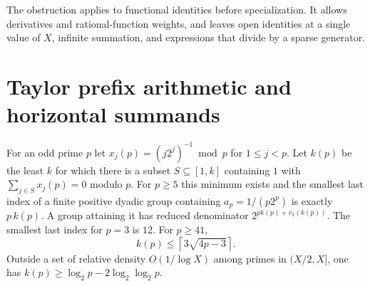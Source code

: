 \documentclass[11pt]{article}
\begin{document}
The obstruction applies to functional identities before specialization. It allows derivatives and rational-function weights, and leaves open identities at a single value of $X$, infinite summation, and expressions that divide by a sparse generator.

\section{Taylor prefix arithmetic and horizontal summands}\label{sec:taylor}

\begin{proposition}\label{prop:completion}
For an odd prime $p$ let $x_j(p)=(j2^j)^{-1}\bmod p$ for $1\le j<p$. Let $k(p)$ be the least $k$ for which there is a subset $S\subseteq[1,k]$ containing $1$ with $\sum_{j\in S}x_j(p)=0$ modulo $p$. For $p\ge5$ this minimum exists and the smallest last index of a finite positive dyadic group containing $a_p=1/(p2^p)$ is exactly $p\,k(p)$. A group attaining it has reduced denominator $2^{p k(p)+v_2(k(p))}$. The smallest last index for $p=3$ is $12$. For $p\ge41$,
\[
 k(p)\le\left\lceil3\sqrt{4p-3}\right\rceil .
\]
Outside a set of relative density $O(1/\log X)$ among primes in $(X/2,X]$, one has $k(p)\ge\log_2p-2\log_2\log_2p$.
\end{proposition}
\end{document}
